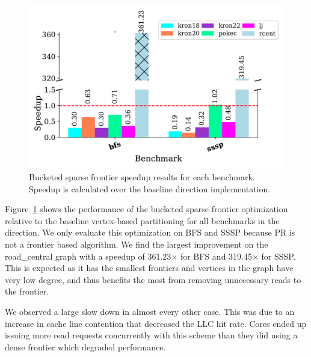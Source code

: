 \begin{figure}[h]
    \centering
    \includegraphics[scale=0.6]{graphit-figures/sparse.pdf}
    \caption{Bucketed sparse frontier speedup results for each benchmark. Speedup is calculated over the baseline \push direction implementation.} %
    \label{pap:cgo2020:sec:eval:fig:sparse}
\end{figure}

Figure~\ref{pap:cgo2020:sec:eval:fig:sparse} shows the performance of the bucketed sparse frontier optimization relative to the baseline vertex-based partitioning for all benchmarks in the \push direction.
We only evaluate this optimization on BFS and SSSP because PR is not a frontier based algorithm.
We find the largest improvement on the road\_central graph with a speedup of 361.23$\times$ for BFS and 319.45$\times$ for SSSP.
This is expected as it has the smallest frontiers and vertices in the graph have very low degree, and thus benefits the most from removing unnecessary reads to the frontier.

We observed a large slow down in almost every other case.
This was due to an increase in cache line contention that decreased the LLC hit rate. 
Cores ended up issuing more read requests concurrently with this scheme than they did using a dense frontier which degraded performance.
 




